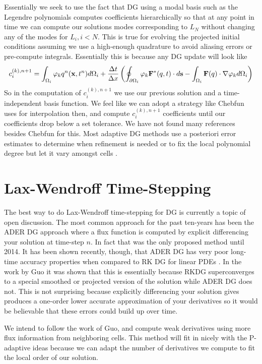 \documentclass[10]{amsart}
\begin{document}
Essentially we seek to use the fact that DG using a modal basis such as the Legendre polynomials computes coefficients hierarchically
so that at any point in time we can compute our solutions modes corresponding to $L_N$ without changing any of the modes
for $L_{i}, i <N$. This is true for evolving the projected initial conditions assuming we use a high-enough quadrature to avoid aliasing errors or pre-compute integrals. Essentially this is because any DG update will look like
\begin{equation*}c_i^{(k),n+1}=\int_{\Omega_i} \varphi_k q^n({\bf x},t^n) d\Omega_i +\frac{\Delta t}{\Delta x}
\left( \oint_{\partial \Omega_i} \varphi_k {\bf F}^{*}(q,t) \cdot d{\bf s} - \int_{\Omega_i} {\bf F}(q)
\cdot \nabla \varphi_k d\Omega_i\right)\end{equation*} 
So in the computation of $c_i^{(k),n+1}$ we use our previous solution and a time-independent basis function.
We feel like we can adopt a strategy like Chebfun uses for interpolation then, and compute $c_i^{(k),n+1}$
coefficients until our coefficients drop below a set tolerance. We have not
found many references besides Chebfun for this. Most adaptive DG methods use a posteriori error estimates to determine when refinement is needed \cite{berger1998adaptive,fankhauser2014hp} or to fix the local polynomial degree but let it vary amongst cells \cite{dumbser2007arbitrary}.

\section{Lax-Wendroff Time-Stepping}
The best way to do Lax-Wendroff time-stepping for DG is currently a topic of open discussion. The most common
approach for the past ten-years has been the ADER DG approach \cite{dumbser2005ader,dumbser2007arbitrary} where a flux function is computed by
explicit differencing your solution at time-step $n$. In fact that was the only proposed method until
2014. It has been shown recently, though, that ADER DG has very poor long-time accuracy properties when compared to 
RK DG for linear PDEs \cite{guo2014new}. In the work by Guo it was shown that this is essentially because RKDG superconverges
to a special smoothed or projected version of the solution while ADER DG does not. This is not surprising because explicitly
differencing your solution gives produces a one-order lower accurate approximation of your derivatives so it would be believable
that these errors could build up over time.

We intend to follow the work of Guo, and compute weak derivatives using more flux information
from neighboring cells. This
method will fit in nicely with the P-adaptive ideas because we can adapt the number of derivatives we compute to fit the local
order of our solution.



\end{document}
